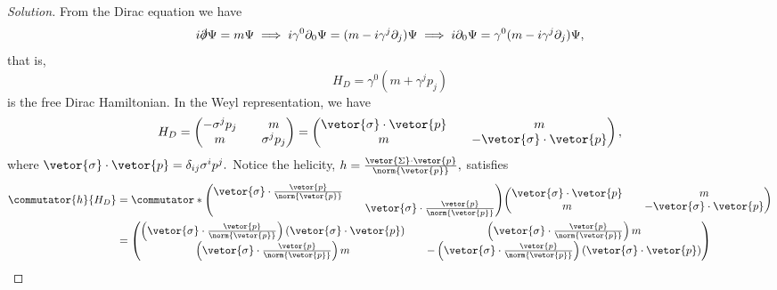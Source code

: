 \begin{proof}[Solution]
   From the Dirac equation we have
   \begin{equation*}
       i\slashed{\partial}\Psi = m \Psi \implies i \gamma^0\partial_0 \Psi = (m - i \gamma^j \partial_j)\Psi \implies i \partial_0 \Psi = \gamma^0 (m - i \gamma^j \partial_j) \Psi,
   \end{equation*}
   that is, 
   \begin{equation*}
      H_D = \gamma^0 (m + \gamma^j p_j)
   \end{equation*}
   is the free Dirac Hamiltonian. In the Weyl representation, we have
   \begin{equation*}
      H_D = \begin{pmatrix}
         -\sigma^j p_j && m\\
         m && \sigma^j p_j
      \end{pmatrix} = \begin{pmatrix}
         \vetor{\sigma} \cdot \vetor{p} && m\\
         m && -\vetor{\sigma} \cdot \vetor{p}
      \end{pmatrix},
   \end{equation*}
   where \(\vetor{\sigma} \cdot \vetor{p} = \delta_{ij} \sigma^i p^j.\) Notice the helicity, \(h = \frac{\vetor{\Sigma} \cdot \vetor{p}}{\norm{\vetor{p}}},\) satisfies
   \begin{align*}
      \commutator{h}{H_D} &= \commutator*{\begin{pmatrix}
            \vetor{\sigma} \cdot \frac{\vetor{p}}{\norm{\vetor{p}}} &&\\
                                                                    && \vetor{\sigma} \cdot \frac{\vetor{p}}{\norm{\vetor{p}}}
      \end{pmatrix}}
      {\begin{pmatrix}
            \vetor{\sigma} \cdot \vetor{p} && m\\
            m && -\vetor{\sigma} \cdot \vetor{p}
         \end{pmatrix}}\\
                          &=
         \begin{pmatrix}
            \left(\vetor{\sigma}\cdot\frac{\vetor{p}}{\norm{\vetor{p}}}\right)(\vetor{\sigma}\cdot \vetor{p}) && \left(\vetor{\sigma}\cdot\frac{\vetor{p}}{\norm{\vetor{p}}}\right)m\\
            \left(\vetor{\sigma}\cdot\frac{\vetor{p}}{\norm{\vetor{p}}}\right)m && -\left(\vetor{\sigma}\cdot\frac{\vetor{p}}{\norm{\vetor{p}}}\right)(\vetor{\sigma} \cdot \vetor{p})

\end{pmatrix}
\end{align*}
\end{proof}
